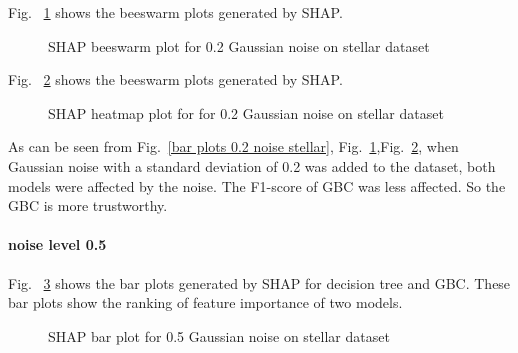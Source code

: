 \documentclass[runningheads,a4paper]{llncs}
\begin{document}
Fig. ~\ref{bee plots 0.2 noise stellar} shows the beeswarm plots generated by SHAP.
\begin{figure}[H]
	\centering
	
	\hfill
	
	
	\caption{SHAP beeswarm plot for 0.2 Gaussian noise on stellar dataset}
	\label{bee plots 0.2 noise stellar}
	
\end{figure}
Fig. ~\ref{heat plots 0.2 noise stellar} shows the beeswarm plots generated by SHAP.
\begin{figure}[H]
	\centering
	
	\hfill
	
	
	\caption{SHAP heatmap plot for for 0.2 Gaussian noise  on stellar dataset}
	\label{heat plots 0.2 noise stellar}
	
\end{figure}


As can be seen from Fig.~\ref{bar plots 0.2 noise stellar}, Fig.~\ref{bee plots 0.2 noise stellar},Fig.~\ref{heat plots 0.2 noise stellar}, when Gaussian noise with a standard deviation of 0.2 was added to the dataset, both models were affected by the noise. The F1-score of GBC was less affected. So the GBC is more trustworthy.

\paragraph{noise level 0.5}
Fig. ~\ref{bar plots 0.5 noise stellar} shows the bar plots generated by SHAP for decision tree and GBC. These bar plots show the ranking of feature importance of two models.
\begin{figure}[H]
	\centering
	
	\hfill
	
	
	\caption{SHAP bar plot for 0.5 Gaussian noise on stellar dataset}
	\label{bar plots 0.5 noise stellar}
\end{figure}
\end{document}
